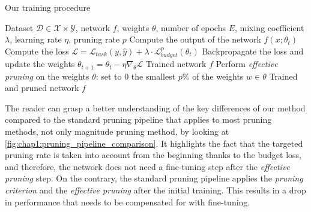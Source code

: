 \begin{algorithm}
  \caption{Our training procedure}
  \label{alg:chap1:training_pruning}
  \begin{algorithmic}
  \REQUIRE Dataset $\mathcal{D} \in \mathcal{X} \times \mathcal{Y}$, network $f$,
  weights $\theta$, number of epochs $E$, mixing coefficient $\lambda$, learning
  rate $\eta$, pruning rate $p$
          \STATE Compute the output of the network $f(x; \theta_t)$
          \STATE Compute the loss $\mathcal{L}= \mathcal{L}_{task}(y, \hat{y}) + \lambda \cdot \mathcal{L}^{p}_{budget}(\theta_t)$
          \STATE Backpropagate the loss and update the weights $\theta_{t+1} = \theta_t - \eta \nabla_{\theta} \mathcal{L}$
      \ENDFOR
  \ENDFOR
  \RETURN Trained network $f$
  \STATE Perform \emph{effective pruning} on the weights $\theta$: set to 0 the
  smallest $p$\% of the weights $w\in\theta$
  \RETURN Trained and pruned network $f$
  \end{algorithmic}
  \end{algorithm}


The reader can grasp a better understanding of the key differences of our method
compared to the standard pruning pipeline that applies to most pruning methods,
not only magnitude pruning method, by looking at
\cref{fig:chap1:pruning_pipeline_comparison}. It highlights the fact that the
targeted pruning rate is taken into account from the beginning thanks to the
budget loss, and therefore, the network does not need a fine-tuning step after
the \emph{effective pruning} step. On the contrary, the standard pruning
pipeline applies the \emph{pruning criterion} and the \emph{effective pruning}
after the initial training. This results in a drop in performance that needs to
be compensated for with fine-tuning. \\

